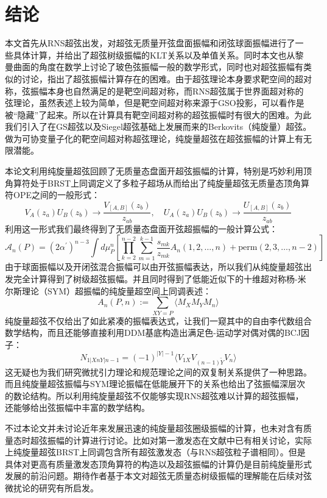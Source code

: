 \chapter{结论}

本文首先从RNS超弦出发，对超弦无质量开弦盘面振幅和闭弦球面振幅进行了一些具体计算，并给出了超弦树级振幅的KLT关系以及单值关系。同时本文也从黎曼曲面的角度在数学上讨论了玻色弦振幅一般的数学形式，同时也对超弦振幅有类似的讨论，指出了超弦振幅计算存在的困难。由于超弦理论本身要求靶空间的超对称，弦振幅本身也自然满足的是靶空间超对称，而RNS超弦属于世界面超对称的弦理论，虽然表述上较为简单，但是靶空间超对称来源于GSO投影，可以看作是被“隐藏”了起来。所以在计算具有靶空间超对称的超弦振幅时有很大的困难。为此我们引入了在GS超弦以及Siegel超弦基础上发展而来的Berkovits（纯旋量）超弦。做为可协变量子化的靶空间超对称超弦理论，纯旋量超弦在超弦振幅的计算上有无限潜能。

本论文利用纯旋量超弦回顾了无质量态盘面开超弦振幅的计算，特别是巧妙利用顶角算符处于BRST上同调定义了多粒子超场从而给出了纯旋量超弦无质量态顶角算符OPE之间的一般形式：
\begin{equation}
	V_A(z_a)U_B(z_b) \to \frac{V_{[A,B]}(z_b)}{z_{ab}}, \quad U_A(z_a)U_B(z_b) \to \frac{U_{[A,B]}(z_b)}{z_{ab}}
\end{equation}
利用这一形式我们最终得到了无质量态盘面开弦超振幅的一般计算公式：
\begin{equation}
		\mathcal{A}_n(P)=(2\alpha^{\prime})^{n-3}\int d\mu_P^n\left[\prod_{k=2}^{n-2}\sum_{m=1}^{k-1}\frac{s_{mk}}{z_{mk}}A_n(1,2,\ldots,n)+\mathrm{perm}(2,3,\ldots,n-2)\right]
\end{equation}
由于球面振幅以及开闭弦混合振幅可以由开弦振幅表达，所以我们从纯旋量超弦出发完全计算得到了树级超弦振幅。并且同时得到了低能近似下的十维超对称杨-米尔斯理论（SYM）超振幅的纯旋量超空间上同调表述：
\begin{equation}
	A_n(P,n):=\sum_{XY=P}\langle M_XM_YM_n\rangle
\end{equation}
纯旋量超弦不仅给出了如此紧凑的振幅表达式，让我们一窥其中的自由李代数组合数学结构，而且还能够直接利用DDM基底构造出满足色-运动学对偶对偶的BCJ因子：
\begin{equation}
	N_{1|XnY|n-1}=(-1)^{|Y|-1}\langle V_{1X}V_{(n-1)\tilde{Y}}V_{n}\rangle
\end{equation}
这无疑也为我们研究微扰引力理论和规范理论之间的双复制关系提供了一种思路。而且纯旋量超弦振幅与SYM理论振幅在低能展开下的关系也给出了弦振幅深层次的数论结构。所以利用纯旋量超弦不仅能够实现RNS超弦难以计算的超弦振幅，还能够给出弦振幅中丰富的数学结构。

不过本论文并未讨论近年来发展迅速的纯旋量超弦圈级振幅的计算，也未对含有质量态时超弦振幅的计算进行讨论。比如对第一激发态在文献\cite{Berkovits:2002qx,Chakrabarti:2018mqd,Chakrabarti:2018bah}中已有相关讨论，实际上纯旋量超弦BRST上同调包含所有超弦激发态（与RNS超弦粒子谱相同）\cite{Berkovits:2000nn,Berkovits:2001mx,Aisaka:2008vw}。但是具体对更高有质量激发态顶角算符的构造以及超弦振幅的计算仍是目前纯旋量形式发展的前沿问题。期待作者基于本文对超弦无质量态树级振幅的理解能在后续对弦微扰论的研究有所启发。